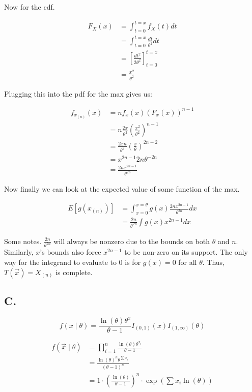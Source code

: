 Now for the cdf.

\begin{align*}
	F_X(x) &= \int_{t=0}^{t=x} f_X(t) dt \\
	&= \int_{t=0}^{t=x} \frac{dt}{\theta^2} dt \\
	&= \left[ \frac{dt^2}{2\theta^2} \right]_{t=0}^{t=x} \\
	&= \frac{x^2}{\theta^2}
\end{align*}

Plugging this into the pdf for the max gives us:

\begin{align*}
	f_{x_{(n)}}(x) &= n f_x(x) (F_x(x))^{n-1} \\
	&= n \frac{2x}{\theta^2} \left( \frac{x^2}{\theta^2} \right)^{n-1} \\
	&= \frac{2xn}{\theta^2} \left( \frac{x}{\theta} \right)^{2n-2} \\
	&= x^{2n-1}2n\theta^{-2n} \\
	&= \frac{2nx^{2n-1}}{\theta^{2n}}
\end{align*}

Now finally we can look at the expected value of some function of the max.

\begin{align*}
	E[g(x_{(n)})] &= \int_{x=0}^{x=\theta} g(x) \frac{2nx^{2n-1}}{\theta^{2n}} dx \\
	&= \frac{2n}{\theta^{2n}} \int g(x) x^{2n-1} dx
\end{align*}

Some notes. $\frac{2n}{\theta^{2n}}$ will always be nonzero due to the bounds on both $\theta$ and $n$. Similarly, $x$'s bounds also force $x^{2n-1}$ to be non-zero on its support. The only way for the integrand to evaluate to 0 is for $g(x) = 0$ for all $\theta$. Thus, $T(\vec{x}) = X_{(n)}$ is complete.

\pagebreak
\subsection*{C.}

\[
	f(x \mid \theta) = \frac{\ln(\theta) \theta^x}{\theta - 1} I_{(0,1)}(x) I_{(1, \infty)}(\theta)
\]

\begin{align*}
	f(\vec{x} \mid \theta) &= \prod_{i=1}^n \frac{\ln(\theta) \theta^{x_i}}{\theta - 1} \\
	&= \frac{\ln(\theta)^n \theta^{\sum x_i}}{(\theta - 1)^n} \\
	&= 1 \cdot \left( \frac{\ln(\theta)}{\theta-1} \right)^n \cdot \exp\left( \sum x_i \ln(\theta) \right)
\end{align*}


